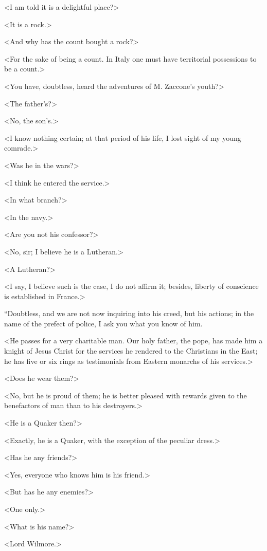  <I am told it is a delightful place?> 

 <It is a rock.> 

 <And why has the count bought a rock?> 

 <For the sake of being a count. In Italy one must have territorial possessions to be a count.> 

 <You have, doubtless, heard the adventures of M. Zaccone's youth?> 

 <The father's?> 

 <No, the son's.> 

 <I know nothing certain; at that period of his life, I lost sight of my young comrade.> 

 <Was he in the wars?> 

 <I think he entered the service.> 

 <In what branch?> 

 <In the navy.> 

 <Are you not his confessor?> 

 <No, sir; I believe he is a Lutheran.> 

 <A Lutheran?> 

 <I say, I believe such is the case, I do not affirm it; besides, liberty of conscience is established in France.> 

 “Doubtless, and we are not now inquiring into his creed, but his actions; in the name of the prefect of police, I ask you what you know of him. 

 <He passes for a very charitable man. Our holy father, the pope, has made him a knight of Jesus Christ for the services he rendered to the Christians in the East; he has five or six rings as testimonials from Eastern monarchs of his services.> 

 <Does he wear them?> 

 <No, but he is proud of them; he is better pleased with rewards given to the benefactors of man than to his destroyers.> 

 <He is a Quaker then?> 

 <Exactly, he is a Quaker, with the exception of the peculiar dress.> 

 <Has he any friends?> 

 <Yes, everyone who knows him is his friend.> 

 <But has he any enemies?> 

 <One only.> 

 <What is his name?> 

 <Lord Wilmore.> 

